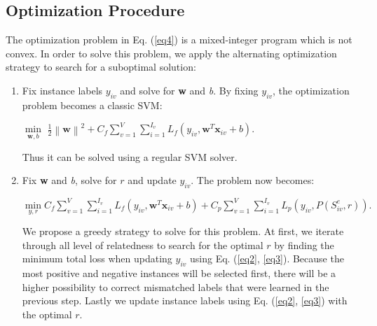 \subsection{Optimization Procedure} 
The optimization problem in Eq. (\ref{eq4}) is a mixed-integer program which is not convex. In order to solve this problem, we apply the alternating optimization strategy to search for a suboptimal solution:
\begin{enumerate}
	\item{} Fix instance labels $y_{iv}$ and solve for \textbf{w} and \textit{b}. By fixing $y_{iv}$, the optimization problem becomes a classic SVM:
	\begin{center}
	$\min\limits_{\textbf{w},b}$ $\frac{1}{2} \left \| \textbf{w} \right \|^{2} + C_{f} \sum_{v=1}^{V}\sum_{i=1}^{I_{v}}L_{f}\left ( y_{iv}, \textbf{w}^{T}\textbf{x}_{iv}+b \right )$. 
	\end{center}
	Thus it can be solved using a regular SVM solver.
	
	\item{} Fix \textbf{w} and \textit{b}, solve for $r$ and update $y_{iv}$. The problem now becomes: 
	
	\begin{center}
	$\min\limits_{y,r} C_{f} \sum_{v=1}^{V}\sum_{i=1}^{I_{v}}L_{f}\left ( y_{iv}, \textbf{w}^{T}\textbf{x}_{iv}+b \right ) 
	+ C_{p} \sum_{v=1}^{V}\sum_{i=1}^{I_{v}}L_{p}\left ( y_{iv}, P(S_{iv}^{e},r) \right ).$
	\end{center}
		
	We propose a greedy strategy to solve for this problem. At first, we iterate through all level of relatedness to search for the optimal $r$ by finding the minimum total loss when updating $y_{iv}$ using Eq. (\ref{eq2}, \ref{eq3}). Because the most positive and negative instances will be selected first, there will be a higher possibility to correct mismatched labels that were learned in the previous step. Lastly we update instance labels using Eq. (\ref{eq2}, \ref{eq3}) with the optimal $r$. 
	
\end{enumerate}

